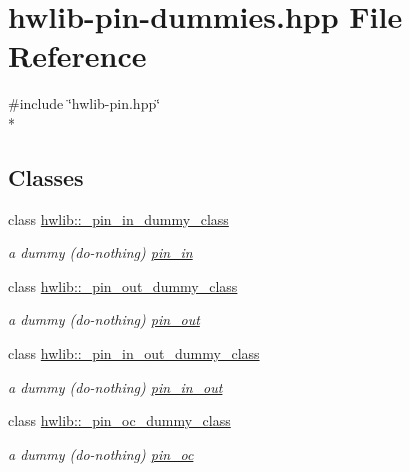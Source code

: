 \hypertarget{hwlib-pin-dummies_8hpp}{}\section{hwlib-\/pin-\/dummies.hpp File Reference}
\label{hwlib-pin-dummies_8hpp}
{\ttfamily \#include \char`\"{}hwlib-\/pin.\+hpp\char`\"{}}\\*
\subsection*{Classes}
\begin{DoxyCompactItemize}
\item 
class \hyperlink{classhwlib_1_1__pin__in__dummy__class}{hwlib\+::\+\_\+pin\+\_\+in\+\_\+dummy\+\_\+class}
\begin{DoxyCompactList}\small\item\em a dummy (do-\/nothing) \hyperlink{classhwlib_1_1pin__in}{pin\+\_\+in} \end{DoxyCompactList}\item 
class \hyperlink{classhwlib_1_1__pin__out__dummy__class}{hwlib\+::\+\_\+pin\+\_\+out\+\_\+dummy\+\_\+class}
\begin{DoxyCompactList}\small\item\em a dummy (do-\/nothing) \hyperlink{classhwlib_1_1pin__out}{pin\+\_\+out} \end{DoxyCompactList}\item 
class \hyperlink{classhwlib_1_1__pin__in__out__dummy__class}{hwlib\+::\+\_\+pin\+\_\+in\+\_\+out\+\_\+dummy\+\_\+class}
\begin{DoxyCompactList}\small\item\em a dummy (do-\/nothing) \hyperlink{classhwlib_1_1pin__in__out}{pin\+\_\+in\+\_\+out} \end{DoxyCompactList}\item 
class \hyperlink{classhwlib_1_1__pin__oc__dummy__class}{hwlib\+::\+\_\+pin\+\_\+oc\+\_\+dummy\+\_\+class}
\begin{DoxyCompactList}\small\item\em a dummy (do-\/nothing) \hyperlink{classhwlib_1_1pin__oc}{pin\+\_\+oc} \end{DoxyCompactList}\end{DoxyCompactItemize}
